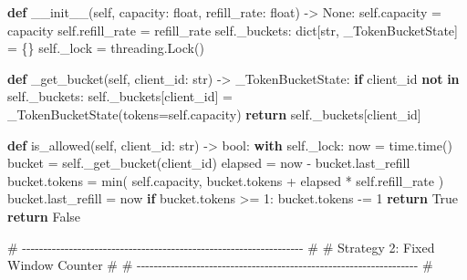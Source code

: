 \documentclass[11pt]{article}
\newenvironment{Shaded}{\begin{snugshade}}{\end{snugshade}}
\newcommand{\BuiltInTok}[1]{\textcolor[rgb]{0.50,0.55,0.55}{#1}}
\newcommand{\CommentTok}[1]{\textcolor[rgb]{0.48,0.49,0.49}{#1}}
\newcommand{\ControlFlowTok}[1]{\textcolor[rgb]{0.99,0.74,0.29}{\textbf{#1}}}
\newcommand{\DecValTok}[1]{\textcolor[rgb]{0.96,0.45,0.00}{#1}}
\newcommand{\FunctionTok}[1]{\textcolor[rgb]{0.56,0.27,0.68}{#1}}
\newcommand{\KeywordTok}[1]{\textcolor[rgb]{0.81,0.81,0.76}{\textbf{#1}}}
\newcommand{\NormalTok}[1]{\textcolor[rgb]{0.81,0.81,0.76}{#1}}
\newcommand{\OperatorTok}[1]{\textcolor[rgb]{0.81,0.81,0.76}{#1}}
\newcommand{\VariableTok}[1]{\textcolor[rgb]{0.15,0.68,0.68}{#1}}
\begin{document}
\begin{Shaded}
\begin{Highlighting}[]
    \KeywordTok{def} \FunctionTok{\_\_init\_\_}\NormalTok{(}\VariableTok{self}\NormalTok{, capacity: }\BuiltInTok{float}\NormalTok{, refill\_rate: }\BuiltInTok{float}\NormalTok{) }\OperatorTok{{-}\textgreater{}} \VariableTok{None}\NormalTok{:}
        \VariableTok{self}\NormalTok{.capacity }\OperatorTok{=}\NormalTok{ capacity}
        \VariableTok{self}\NormalTok{.refill\_rate }\OperatorTok{=}\NormalTok{ refill\_rate}
        \VariableTok{self}\NormalTok{.\_buckets: }\BuiltInTok{dict}\NormalTok{[}\BuiltInTok{str}\NormalTok{, \_TokenBucketState] }\OperatorTok{=}\NormalTok{ \{\}}
        \VariableTok{self}\NormalTok{.\_lock }\OperatorTok{=}\NormalTok{ threading.Lock()}

    \KeywordTok{def}\NormalTok{ \_get\_bucket(}\VariableTok{self}\NormalTok{, client\_id: }\BuiltInTok{str}\NormalTok{) }\OperatorTok{{-}\textgreater{}}\NormalTok{ \_TokenBucketState:}
        \ControlFlowTok{if}\NormalTok{ client\_id }\KeywordTok{not} \KeywordTok{in} \VariableTok{self}\NormalTok{.\_buckets:}
            \VariableTok{self}\NormalTok{.\_buckets[client\_id] }\OperatorTok{=}\NormalTok{ \_TokenBucketState(tokens}\OperatorTok{=}\VariableTok{self}\NormalTok{.capacity)}
        \ControlFlowTok{return} \VariableTok{self}\NormalTok{.\_buckets[client\_id]}

    \KeywordTok{def}\NormalTok{ is\_allowed(}\VariableTok{self}\NormalTok{, client\_id: }\BuiltInTok{str}\NormalTok{) }\OperatorTok{{-}\textgreater{}} \BuiltInTok{bool}\NormalTok{:}
        \ControlFlowTok{with} \VariableTok{self}\NormalTok{.\_lock:}
\NormalTok{            now }\OperatorTok{=}\NormalTok{ time.time()}
\NormalTok{            bucket }\OperatorTok{=} \VariableTok{self}\NormalTok{.\_get\_bucket(client\_id)}
\NormalTok{            elapsed }\OperatorTok{=}\NormalTok{ now }\OperatorTok{{-}}\NormalTok{ bucket.last\_refill}
\NormalTok{            bucket.tokens }\OperatorTok{=} \BuiltInTok{min}\NormalTok{(}
                \VariableTok{self}\NormalTok{.capacity,}
\NormalTok{                bucket.tokens }\OperatorTok{+}\NormalTok{ elapsed }\OperatorTok{*} \VariableTok{self}\NormalTok{.refill\_rate}
\NormalTok{            )}
\NormalTok{            bucket.last\_refill }\OperatorTok{=}\NormalTok{ now}
            \ControlFlowTok{if}\NormalTok{ bucket.tokens }\OperatorTok{\textgreater{}=} \DecValTok{1}\NormalTok{:}
\NormalTok{                bucket.tokens }\OperatorTok{{-}=} \DecValTok{1}
                \ControlFlowTok{return} \VariableTok{True}
            \ControlFlowTok{return} \VariableTok{False}


\CommentTok{\# {-}{-}{-}{-}{-}{-}{-}{-}{-}{-}{-}{-}{-}{-}{-}{-}{-}{-}{-}{-}{-}{-}{-}{-}{-}{-}{-}{-}{-}{-}{-}{-}{-}{-}{-}{-}{-}{-}{-}{-}{-}{-}{-}{-}{-}{-}{-}{-}{-}{-}{-}{-}{-}{-}{-}{-}{-}{-}{-}{-}{-}{-}{-}{-}{-}{-} \#}
\CommentTok{\# Strategy 2: Fixed Window Counter                                    \#}
\CommentTok{\# {-}{-}{-}{-}{-}{-}{-}{-}{-}{-}{-}{-}{-}{-}{-}{-}{-}{-}{-}{-}{-}{-}{-}{-}{-}{-}{-}{-}{-}{-}{-}{-}{-}{-}{-}{-}{-}{-}{-}{-}{-}{-}{-}{-}{-}{-}{-}{-}{-}{-}{-}{-}{-}{-}{-}{-}{-}{-}{-}{-}{-}{-}{-}{-}{-}{-} \#}


\end{Highlighting}
\end{Shaded}
\end{document}
